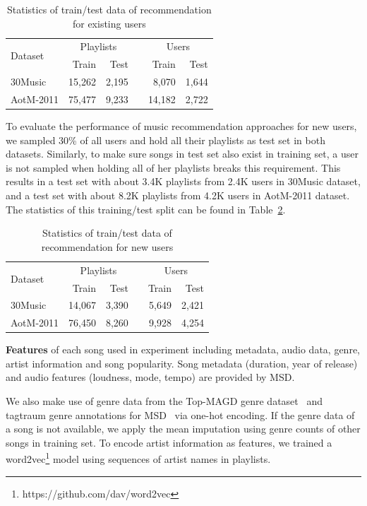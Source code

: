 \begin{table}[!h]
\centering
\caption{Statistics of train/test data of recommendation for existing users}
\label{tab:stats_warm}
\begin{tabular}{lrrcrr}
\toprule
\multirow{2}{*}{Dataset}  & \multicolumn{2}{c}{Playlists} && \multicolumn{2}{c}{Users} \\ \cmidrule{2-3} \cmidrule{5-6}
                          & Train & Test && Train & Test \\
\midrule
30Music   & 15,262 & 2,195 &&  8,070 & 1,644 \\
AotM-2011 & 75,477 & 9,233 && 14,182 & 2,722 \\
\bottomrule
\end{tabular}
\end{table}

To evaluate the performance of music recommendation approaches for new users,
we sampled 30\% of all users and hold all their playlists as test set in both datasets.
Similarly, to make sure songs in test set also exist in training set,
a user is not sampled when holding all of her playlists breaks this requirement.
This results in a test set with about 3.4K playlists from 2.4K users in 30Music dataset,
and a test set with about 8.2K playlists from 4.2K users in AotM-2011 dataset.
The statistics of this training/test split can be found in Table~\ref{tab:stats_cold}.

\begin{table}[!h]
\centering
\caption{Statistics of train/test data of recommendation for new users}
\label{tab:stats_cold}
\begin{tabular}{lrrcrr}
\toprule
\multirow{2}{*}{Dataset}  & \multicolumn{2}{c}{Playlists} && \multicolumn{2}{c}{Users} \\ \cmidrule{2-3} \cmidrule{5-6}
                          & Train & Test && Train & Test \\
\midrule
30Music   & 14,067 & 3,390 && 5,649 & 2,421 \\
AotM-2011 & 76,450 & 8,260 && 9,928 & 4,254 \\       
\bottomrule
\end{tabular}
\end{table}


{\bf Features} of each song used in experiment including metadata, audio data, genre, artist information and song popularity.
Song metadata (\eg duration, year of release) and audio features (\eg loudness, mode, tempo) are provided by MSD.

We also make use of genre data from the Top-MAGD genre dataset~\cite{schindler2012facilitating} 
and tagtraum genre annotations for MSD~\cite{schreiber2015improving} via one-hot encoding.
If the genre data of a song is not available, we apply the mean imputation using genre counts of other songs in training set.
To encode artist information as features, 
we trained a word2vec\footnote{https://github.com/dav/word2vec} model using sequences of artist names in playlists.

